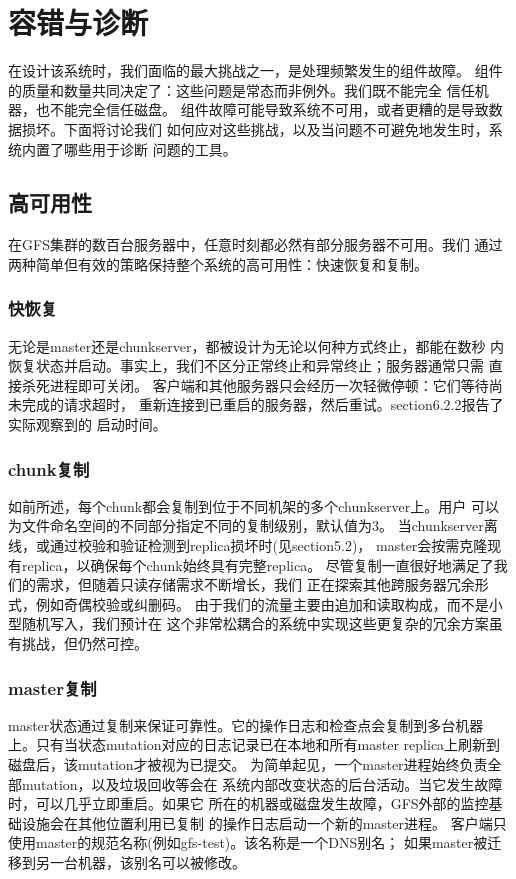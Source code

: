 \section{容错与诊断}
在设计该系统时，我们面临的最大挑战之一，是处理频繁发生的组件故障。
组件的质量和数量共同决定了：这些问题是常态而非例外。我们既不能完全
信任机器，也不能完全信任磁盘。
组件故障可能导致系统不可用，或者更糟的是导致数据损坏。下面将讨论我们
如何应对这些挑战，以及当问题不可避免地发生时，系统内置了哪些用于诊断
问题的工具。

\subsection{高可用性}
在GFS集群的数百台服务器中，任意时刻都必然有部分服务器不可用。我们
通过两种简单但有效的策略保持整个系统的高可用性：快速恢复和复制。

\subsubsection{快恢复}
无论是master还是chunkserver，都被设计为无论以何种方式终止，都能在数秒
内恢复状态并启动。事实上，我们不区分正常终止和异常终止；服务器通常只需
直接杀死进程即可关闭。
客户端和其他服务器只会经历一次轻微停顿：它们等待尚未完成的请求超时，
重新连接到已重启的服务器，然后重试。section6.2.2报告了实际观察到的
启动时间。

\subsubsection{chunk复制}
如前所述，每个chunk都会复制到位于不同机架的多个chunkserver上。用户
可以为文件命名空间的不同部分指定不同的复制级别，默认值为3。
当chunkserver离线，或通过校验和验证检测到replica损坏时(见section5.2)，
master会按需克隆现有replica，以确保每个chunk始终具有完整replica。
尽管复制一直很好地满足了我们的需求，但随着只读存储需求不断增长，我们
正在探索其他跨服务器冗余形式，例如奇偶校验或纠删码。
由于我们的流量主要由追加和读取构成，而不是小型随机写入，我们预计在
这个非常松耦合的系统中实现这些更复杂的冗余方案虽有挑战，但仍然可控。

\subsubsection{master复制}
master状态通过复制来保证可靠性。它的操作日志和检查点会复制到多台机器
上。只有当状态mutation对应的日志记录已在本地和所有master replica上刷新到
磁盘后，该mutation才被视为已提交。
为简单起见，一个master进程始终负责全部mutation，以及垃圾回收等会在
系统内部改变状态的后台活动。当它发生故障时，可以几乎立即重启。如果它
所在的机器或磁盘发生故障，GFS外部的监控基础设施会在其他位置利用已复制
的操作日志启动一个新的master进程。
客户端只使用master的规范名称(例如gfs-test)。该名称是一个DNS别名；
如果master被迁移到另一台机器，该别名可以被修改。

